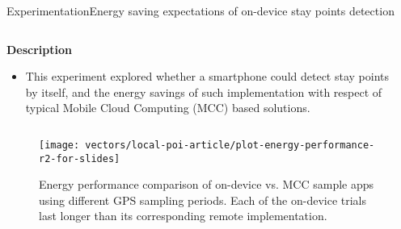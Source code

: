\begin{frame}[noframenumbering]{Experimentation}{Energy saving expectations of on-device stay points detection}
\small
\begin{columns}
\begin{column}{0.55\textwidth}
\begin{block}{\small \textbf{Description}}
\begin{itemize}
  \item This experiment explored whether a smartphone could detect stay points by itself, and the energy savings of such implementation with respect of typical Mobile Cloud Computing (MCC) based solutions.
\end{itemize}
\end{block}
\end{column}

\begin{column}{0.4\textwidth}
\begin{table}
\centering
\renewcommand{\arraystretch}{0.8}
\caption{Input parameters for the energy saving expectations of on-device stay points detection experiment.}
\label{tab:exp-energy-performance-input-parameters}
\end{table}
\end{column}
\end{columns}

\begin{figure}
  \centering
  \texttt{[image: vectors/local-poi-article/plot-energy-performance-r2-for-slides]}
  \caption{Energy performance comparison of on-device vs. MCC sample apps using different GPS sampling periods. Each of the on-device trials last longer than its corresponding remote implementation.}
\end{figure}

\end{frame}



